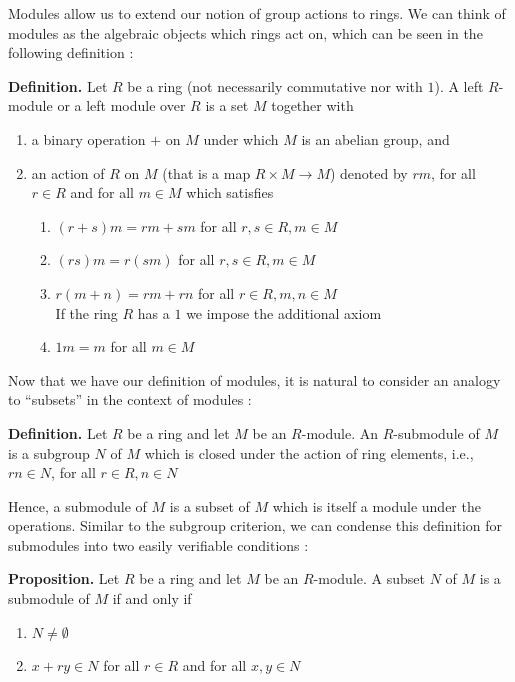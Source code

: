 \documentclass[11pt, reqno]{amsart}
\theoremstyle{plain}
\theoremstyle{definition}
\theoremstyle{example}
\begin{document}
Modules allow us to extend our notion of group actions to rings. We can think of modules as the algebraic objects which rings act on, which can be seen in the following definition \cite[\S 10.1, p. 337]{dummit}:

\par
\textbf{Definition.} Let $R$ be a ring (not necessarily commutative nor with $1$). A left $R$-module or a left module over $R$ is a set $M$ together with
\begin{enumerate}
\item a binary operation $+$ on $M$ under which $M$ is an abelian group, and
\item an action of $R$ on $M$ (that is a map $R \times M \to M$) denoted by $rm$, for all $r \in R$ and for all $m \in M$ which satisfies
\begin{enumerate}[label=\alph*)]
\item $(r+s)m = rm + sm$ for all $r, s \in R, m \in M$
\item $(rs)m = r(sm)$ for all $r,s \in R, m \in M$
\item $r(m + n) = rm + rn$ for all $r \in R, m, n \in M$\\

If the ring $R$ has a $1$ we impose the additional axiom
\item $1m = m$ for all $m \in M$
\end{enumerate}
\end{enumerate}

Now that we have our definition of modules, it is natural to consider an analogy to ``subsets'' in the context of modules \cite[\S 10.1, p. 337]{dummit}:

\par
\textbf{Definition.} Let $R$ be a ring and let $M$ be an $R$-module. An $R$-submodule of $M$ is a subgroup $N$ of $M$ which is closed under the action of ring elements, i.e., $rn \in N$, for all $r \in R, n \in N$

Hence, a submodule of $M$ is a subset of $M$ which is itself a module under the operations. Similar to the subgroup criterion, we can condense this definition for submodules into two easily verifiable conditions \cite[\S 10.1, p. 342]{dummit}:

\par
\textbf{Proposition.} Let $R$ be a ring and let $M$ be an $R$-module. A subset $N$ of $M$ is a submodule of $M$ if and only if
\begin{enumerate}
\item $N \neq \emptyset$
\item $x + ry \in N$ for all $r \in R$ and for all $x, y \in N$
\end{enumerate}
\end{document}
